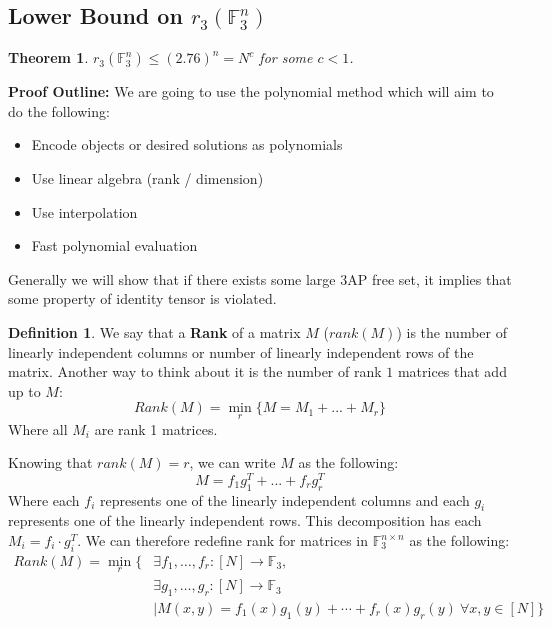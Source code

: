 \documentclass[11pt]{article}
\newtheorem{theorem}{Theorem}[section]
\theoremstyle{definition}
\newtheorem{definition}{Definition}[section]
\begin{document}
\subsection{Lower Bound on $r_3(\mathbb{F}_3^n)$}
\begin{theorem}
    $r_3(\mathbb{F}_3^n) \leq (2.76)^n = N^c$ for some $c < 1$.
\end{theorem}
\textbf{Proof Outline:} We are going to use the polynomial method which will aim to do the following:
\begin{itemize}
    \item Encode objects or desired solutions as polynomials
    \item Use linear algebra (rank / dimension)
    \item Use interpolation
    \item Fast polynomial evaluation
\end{itemize}
Generally we will show that if there exists some large $3$AP free set, it implies that some property of identity tensor is violated.
\begin{definition}
    We say that a \textbf{Rank} of a matrix $M$ ($rank(M)$) is the number of linearly independent columns or number of linearly independent rows of the matrix. Another way to think about it is the number of rank $1$ matrices that add up to $M$:
    $$Rank(M) = \underset{r}{\min} \{ M = M_1 + ... + M_r\}$$
    Where all $M_i$ are rank 1 matrices. 
\end{definition}
Knowing that $rank(M) = r$, we can write $M$ as the following:
$$M = f_1 g_1^T + ... + f_r g_r^T$$
Where each $f_i$ represents one of the linearly independent columns and each $g_i$ represents one of the linearly independent rows. This decomposition has each $M_i = f_i \cdot g_i^T$. We can therefore redefine rank for matrices in $\mathbb{F}_3^{n \times n}$ as the following:
\begin{align*}
    Rank(M) = \min_{r} \Big\{  &\exists f_1, \ldots, f_r: [N] \longrightarrow \mathbb{F}_3, \\
    &\exists g_1, \ldots, g_r: [N] \longrightarrow \mathbb{F}_3 \\
    &\mid M(x,y) = f_1(x) g_1(y) + \cdots + f_r(x) g_r(y)\ \forall x,y \in [N]\Big\}
\end{align*}
\end{document}
